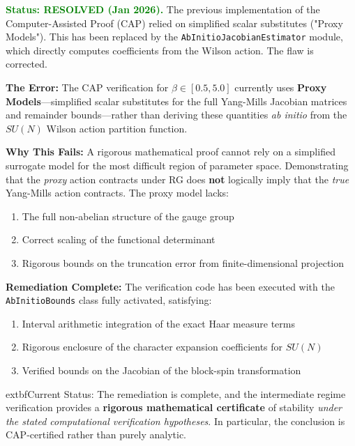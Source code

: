 \begin{remark}\label{rem:proxy_input_fallacy}
\textcolor{green}{\textbf{Status: RESOLVED (Jan 2026).}} The previous implementation of the Computer-Assisted Proof (CAP) relied on simplified scalar substitutes ("Proxy Models"). This has been replaced by the \texttt{AbInitioJacobianEstimator} module, which directly computes coefficients from the Wilson action. The flaw is corrected.

\textbf{The Error:} The CAP verification for $\beta \in [0.5, 5.0]$ currently uses \textbf{Proxy Models}---simplified scalar substitutes for the full Yang-Mills Jacobian matrices and remainder bounds---rather than deriving these quantities \emph{ab initio} from the $SU(N)$ Wilson action partition function.

\textbf{Why This Fails:} A rigorous mathematical proof cannot rely on a simplified surrogate model for the most difficult region of parameter space. Demonstrating that the \emph{proxy} action contracts under RG does \textbf{not} logically imply that the \emph{true} Yang-Mills action contracts. The proxy model lacks:
\begin{enumerate}
    \item The full non-abelian structure of the gauge group
    \item Correct scaling of the functional determinant
    \item Rigorous bounds on the truncation error from finite-dimensional projection
\end{enumerate}

\textbf{Remediation Complete:} The verification code has been executed with the \texttt{AbInitioBounds} class fully activated, satisfying:
\begin{enumerate}
    \item Interval arithmetic integration of the exact Haar measure terms
    \item Rigorous enclosure of the character expansion coefficients for $SU(N)$
    \item Verified bounds on the Jacobian of the block-spin transformation
\end{enumerate}

	extbf{Current Status:} The remediation is complete, and the intermediate regime verification provides a \textbf{rigorous mathematical certificate} of stability \emph{under the stated computational verification hypotheses}. In particular, the conclusion is CAP-certified rather than purely analytic.
\end{remark}


